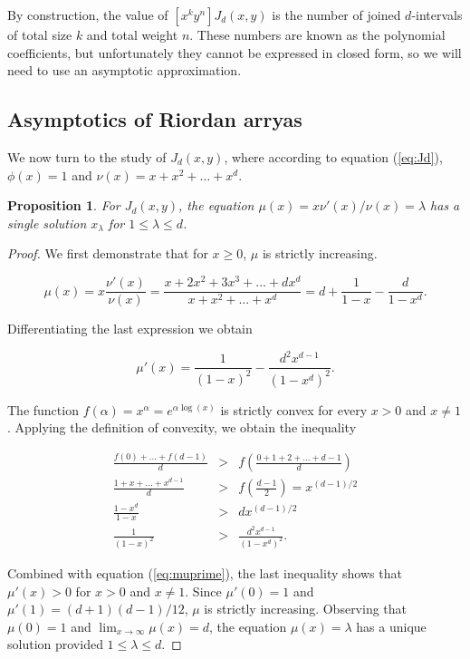 \documentclass{article}
\newtheorem{proposition}{Proposition}
\begin{document}
By construction, the value of $[x^ky^n]J_d(x,y)$ is the number of joined
$d$-intervals of total size $k$ and total weight $n$. These numbers are
known as the polynomial coefficients, but unfortunately they cannot be
expressed in closed form, so we will need to use an asymptotic
approximation.

\subsection{Asymptotics of Riordan arryas}


We now turn to the study of $J_d(x,y)$, where according to equation
(\ref{eq:Jd}), $\phi(x) = 1$ and $\nu(x) = x+x^2+\ldots+x^d$.

\begin{proposition}
\label{th:mu}
For $J_d(x,y)$, the equation $\mu(x) = x\nu'(x)/\nu(x) = \lambda$ has a
single solution $x_\lambda$ for $1 \leq \lambda \leq d$.
\end{proposition}

\begin{proof}
We first demonstrate that for $x \geq 0$, $\mu$ is strictly increasing.

\begin{equation}
\label{eq:mu}
\mu(x) = x\frac{\nu'(x)}{\nu(x)} =
\frac{x+2x^2+3x^3+\ldots+dx^d}{x+x^2+\ldots+x^d} =
d+\frac{1}{1-x} - \frac{d}{1-x^d}.
\end{equation} 

Differentiating the last expression we obtain

\begin{equation}
\label{eq:muprime}
\mu'(x) = \frac{1}{(1-x)^2} -\frac{d^2x^{d-1}}{(1-x^d)^2}.
\end{equation}

The function $f(\alpha) = x^{\alpha} = e^{\alpha \log(x)}$ is strictly
convex for every $x > 0$ and $x \neq 1$. Applying the definition of
convexity, we obtain the inequality

\begin{eqnarray*}
\frac{f(0)+\ldots+f(d-1)}{d} &>&
f\left(\frac{0+1+2+\ldots+d-1}{d}\right) \\
\frac{1+x+\ldots+x^{d-1}}{d} &>& f\left(\frac{d-1}{2}\right)
= x^{(d-1)/2} \\
\frac{1-x^d}{1-x} &>& dx^{(d-1)/2} \\
\frac{1}{(1-x)^2} &>& \frac{d^2x^{d-1}}{(1-x^d)^2}.
\end{eqnarray*}

Combined with equation (\ref{eq:muprime}), the last inequality shows that
$\mu'(x) > 0$ for $x > 0$ and $x \neq 1$. Since $\mu'(0) = 1$ and $\mu'(1)
= (d+1)(d-1)/12$, $\mu$ is strictly increasing. Observing that $\mu(0) =
1$ and $\lim_{x\rightarrow\infty} \mu(x) = d$, the equation $\mu(x) =
\lambda$ has a unique solution provided $1 \leq \lambda \leq d$.
\end{proof}
\end{document}
